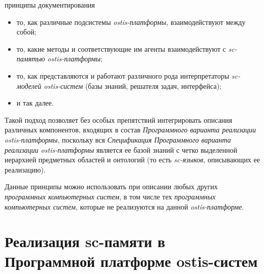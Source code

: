\begin{SCn}
\begin{scnrelfromlistcustom}{принципы документирования}
{\begin{itemize}[labelsep=\tabsize-\bulletsize,leftmargin=\tabsize,label=$\bullet$]
		\item то, как различные подсистемы \textit{ostis-платформы}, взаимодействуют между собой;
		\item то, какие методы и соответствующие им агенты взаимодействуют с \textit{sc-памятью ostis-платформы};
		\item то, как представляются и работают различного рода интерпретаторы \textit{sc-моделей ostis-систем} (базы знаний, решателя задач, интерфейса);
		\item и так далее.
	\end{itemize}
	Такой подход позволяет без особых препятствий интегрировать описания различных компонентов, входящих в состав \textit{Программного варианта реализации ostis-платформы}, поскольку вся \textit{Спецификация Программного варианта реализации ostis-платформы} является ее базой знаний с четко выделенной иерархией предметных областей и онтологий (то есть \textit{sc-языков}, описывающих ее реализацию).}
\end{scnrelfromlistcustom}
\end{SCn}

Данные принципы можно использовать при описании любых других \textit{программных компьютерных систем}, в том числе тех \textit{программных компьютерных систем}, которые не реализуются на данной \textit{ostis-платформе}.

\section{Реализация sc-памяти в Программной платформе ostis-систем}
\label{sec_soft_platform_sc_memory}

